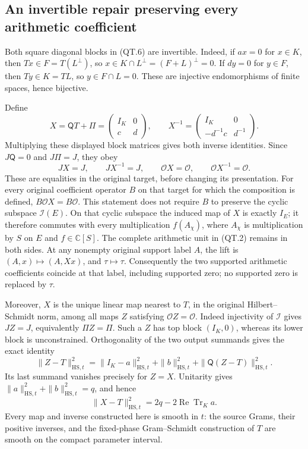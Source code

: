 \subsection{An invertible repair preserving every arithmetic coefficient}

Both square diagonal blocks in (QT.6) are invertible. Indeed, if
\(ax=0\) for \(x\in K\), then \(Tx\in F=T(L^\perp)\), so
\(x\in K\cap L^\perp=(F+L)^\perp=0\).
If \(dy=0\) for \(y\in F\), then \(Ty\in K=TL\), so
\(y\in F\cap L=0\). These are injective endomorphisms of finite
spaces, hence bijective.

Define
\[
 X=\mathsf Q T+\Pi
   =\begin{pmatrix}I_K&0\\c&d\end{pmatrix},\qquad
 X^{-1}=\begin{pmatrix}I_K&0\\-d^{-1}c&d^{-1}\end{pmatrix}.
 \tag{QT.7}\label{CFStage:eq:qt-repair}
\]
Multiplying these displayed block matrices gives both inverse identities.
Since \(J\mathsf Q=0\) and \(J\Pi=J\), they obey
\[
 JX=J,\qquad JX^{-1}=J,\qquad
 \mathcal OX=\mathcal O,\qquad \mathcal OX^{-1}=\mathcal O.
 \tag{QT.8}\label{CFStage:eq:qt-preserve}
\]
These are equalities in the original target, before changing its
presentation. For every original coefficient operator \(B\) on that
target for which the composition is defined,
\(B\mathcal OX=B\mathcal O\). This statement does not require \(B\)
to preserve the cyclic subspace \(\mathcal I(E)\). On that cyclic
subspace the induced map of \(X\) is exactly \(I_E\); it therefore
commutes with every multiplication \(f(A_\chi)\), where \(A_\chi\)
is multiplication by \(S\) on \(E\) and \(f\in\mathbb C[S]\).
The complete arithmetic unit in (QT.2) remains in both sides.
At any nonempty original support label \(A\), the lift is
\((A,x)\mapsto(A,Xx)\), and \(\tau\mapsto\tau\). Consequently the
two supported arithmetic coefficients coincide at that label,
including supported zero; no supported zero is replaced by \(\tau\).

Moreover, \(X\) is the unique linear map nearest to \(T\), in the
original Hilbert--Schmidt norm, among all maps \(Z\) satisfying
\(\mathcal OZ=\mathcal O\). Indeed injectivity of \(\mathcal I\) gives
\(JZ=J\), equivalently \(\Pi Z=\Pi\). Such a \(Z\) has top block
\((I_K,0)\), whereas its lower block is unconstrained. Orthogonality
of the two output summands gives the exact identity
\[
 \|Z-T\|_{\mathrm{HS},t}^2
 =\|I_K-a\|_{\mathrm{HS},t}^2+\|b\|_{\mathrm{HS},t}^2
    +\|\mathsf Q(Z-T)\|_{\mathrm{HS},t}^2.
 \tag{QT.9}\label{CFStage:eq:qt-nearest}
\]
Its last summand vanishes precisely for \(Z=X\). Unitarity gives
\(\|a\|_{\mathrm{HS},t}^2+\|b\|_{\mathrm{HS},t}^2=q\),
and hence
\[
 \|X-T\|_{\mathrm{HS},t}^2
 =2q-2\operatorname{Re}\operatorname{Tr}_K a.
 \tag{QT.10}\label{CFStage:eq:qt-cost}
\]
Every map and inverse constructed here is smooth in \(t\): the source
Grams, their positive inverses, and the fixed-phase Gram--Schmidt
construction of \(T\) are smooth on the compact parameter interval.

